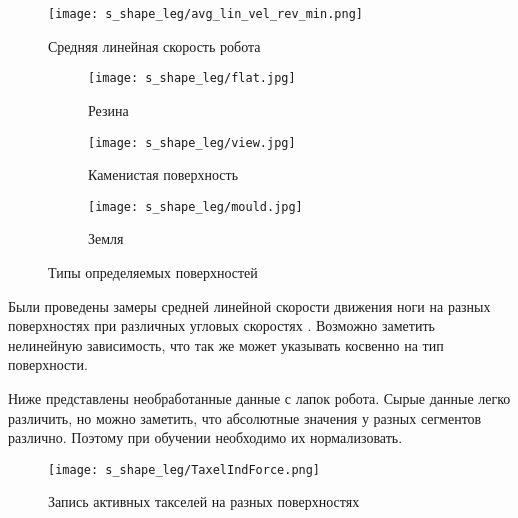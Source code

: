 \begin{figure}[H]
    \centering\texttt{[image: s\_shape\_leg/avg\_lin\_vel\_rev\_min.png]}
    \caption{Средняя линейная скорость робота}
    \label{fig:s_shape_leg/avg_lin_vel_rev_min.png}
\end{figure}


\begin{figure}[H]
    \begin{subfigure}[t]{0.99\textwidth}
        \centering\texttt{[image: s\_shape\_leg/flat.jpg]}
        \caption{Резина}
        \label{fig:s_shape_leg/flat.jpg}
    \end{subfigure}
    
    \begin{subfigure}[t]{0.99\textwidth}
        \centering\texttt{[image: s\_shape\_leg/view.jpg]}
        \caption{Каменистая поверхность}
        \label{fig:s_shape_leg/view.jpg}
    \end{subfigure}

    \begin{subfigure}[t]{0.99\textwidth}
        \centering\texttt{[image: s\_shape\_leg/mould.jpg]}
        \caption{Земля}
        \label{fig:s_shape_leg/mould.jpg}
    \end{subfigure}
    \caption{Типы определяемых поверхностей}
\end{figure}



Были проведены замеры средней линейной скорости движения ноги на разных поверхностях при различных угловых скоростях . Возможно заметить нелинейную зависимость, что так же может указывать косвенно на тип поверхности.

Ниже  представлены необработанные данные с лапок робота. Сырые данные легко различить, но можно заметить, что абсолютные значения у разных сегментов различно. Поэтому при обучении необходимо их нормализовать.

\begin{figure}[H]
    \centering\texttt{[image: s\_shape\_leg/TaxelIndForce.png]}
    \caption{Запись активных такселей на разных поверхностях}
    \label{fig:s_shape_leg/TaxelIndForce_full.png}
\end{figure}


